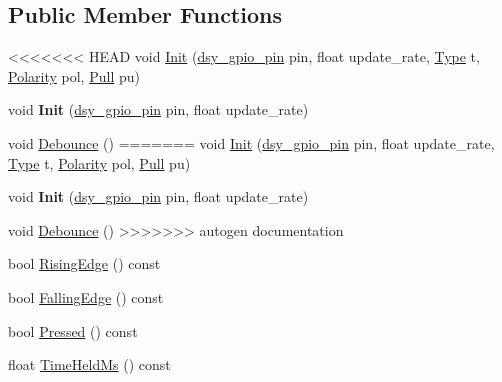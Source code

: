 \subsection*{Public Member Functions}
\begin{DoxyCompactItemize}
\item 
<<<<<<< HEAD
void \hyperlink{classdaisy_1_1_switch_a8ca509a85dbe09f1d27bcc4ae03fc17a}{Init} (\hyperlink{structdsy__gpio__pin}{dsy\+\_\+gpio\+\_\+pin} pin, float update\+\_\+rate, \hyperlink{classdaisy_1_1_switch_a944058682bae079439ddddd42302b483}{Type} t, \hyperlink{classdaisy_1_1_switch_aef37136dd1b4cd077ef82a0f62bcfa3d}{Polarity} pol, \hyperlink{classdaisy_1_1_switch_aa6c26cb923638a248a1d8d3cb1755e51}{Pull} pu)
\item 
\mbox{\label{classdaisy_1_1_switch_af888aafee0f8f8b26853369a9a593145}} 
void {\bfseries Init} (\hyperlink{structdsy__gpio__pin}{dsy\+\_\+gpio\+\_\+pin} pin, float update\+\_\+rate)
\item 
void \hyperlink{classdaisy_1_1_switch_a564849b2de31395dda3cb464a65c5a24}{Debounce} ()
=======
void \hyperlink{classdaisy_1_1_switch_adac599b1203f5eb0d6153110d851b4b4}{Init} (\hyperlink{structdsy__gpio__pin}{dsy\+\_\+gpio\+\_\+pin} pin, float update\+\_\+rate, \hyperlink{classdaisy_1_1_switch_a944058682bae079439ddddd42302b483}{Type} t, \hyperlink{classdaisy_1_1_switch_aef37136dd1b4cd077ef82a0f62bcfa3d}{Polarity} pol, \hyperlink{classdaisy_1_1_switch_aa6c26cb923638a248a1d8d3cb1755e51}{Pull} pu)
\item 
\mbox{\label{classdaisy_1_1_switch_a12c2d93cc7189a52cf058b34d2b41456}} 
void {\bfseries Init} (\hyperlink{structdsy__gpio__pin}{dsy\+\_\+gpio\+\_\+pin} pin, float update\+\_\+rate)
\item 
void \hyperlink{classdaisy_1_1_switch_aa099b4d8f0d7073dd6d5c2f6e9d81d9c}{Debounce} ()
>>>>>>> autogen documentation
\item 
bool \hyperlink{classdaisy_1_1_switch_a71f6054840c76ebe3cb2517dc7830d34}{Rising\+Edge} () const
\item 
bool \hyperlink{classdaisy_1_1_switch_ad41940a1ce698fd80fedb01ceaa240fa}{Falling\+Edge} () const
\item 
bool \hyperlink{classdaisy_1_1_switch_abe39a637bc58c3f5cbbaf5ffaaece7a9}{Pressed} () const
\item 
float \hyperlink{classdaisy_1_1_switch_a648bd3fc767286b3efd56daa7f15ace6}{Time\+Held\+Ms} () const
\end{DoxyCompactItemize}


